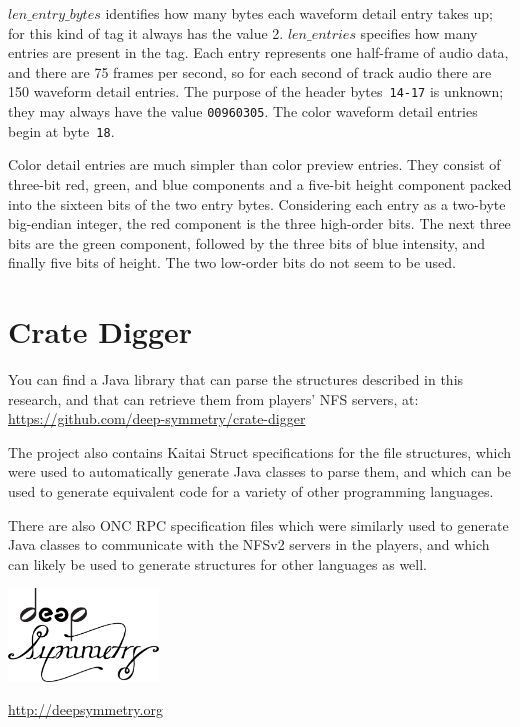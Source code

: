 \documentclass[11pt]{article}
\begin{document}
$len\_entry\_bytes$ identifies how many bytes each waveform detail
entry takes up; for this kind of tag it always has the value 2.
$len\_entries$ specifies how many entries are present in the tag. Each
entry represents one half-frame of audio data, and there are 75 frames
per second, so for each second of track audio there are 150 waveform
detail entries. The purpose of the header bytes~{\tt 14-17} is
unknown; they may always have the value {\tt 00960305}. The color
waveform detail entries begin at byte~{\tt 18}.

Color detail entries are much simpler than color preview entries. They
consist of three-bit red, green, and blue components and a five-bit
height component packed into the sixteen bits of the two entry bytes.
Considering each entry as a two-byte big-endian integer, the red
component is the three high-order bits. The next three bits are the
green component, followed by the three bits of blue intensity, and
finally five bits of height. The two low-order bits do not seem to be
used.

\section{Crate Digger}

You can find a Java library that can parse the structures described in
this research, and that can retrieve them from players' NFS servers,
at: \url{https://github.com/deep-symmetry/crate-digger}

The project also contains Kaitai Struct specifications for the file
structures, which were used to automatically generate Java classes to
parse them, and which can be used to generate equivalent code for a
variety of other programming languages.

There are also ONC RPC specification files which were similarly used
to generate Java classes to communicate with the NFSv2 servers in the
players, and which can likely be used to generate structures for other
languages as well.

\begin{appendix}

  \listoffigures

  \listoftables

  \begin{center}
    \begin{samepage}
      \includegraphics[width=4cm]{assets/DS-Logo-bw-4k}

      \vspace{0.25cm}
      \url{http://deepsymmetry.org}
    \end{samepage}
  \end{center}

\end{appendix}
\end{document}
